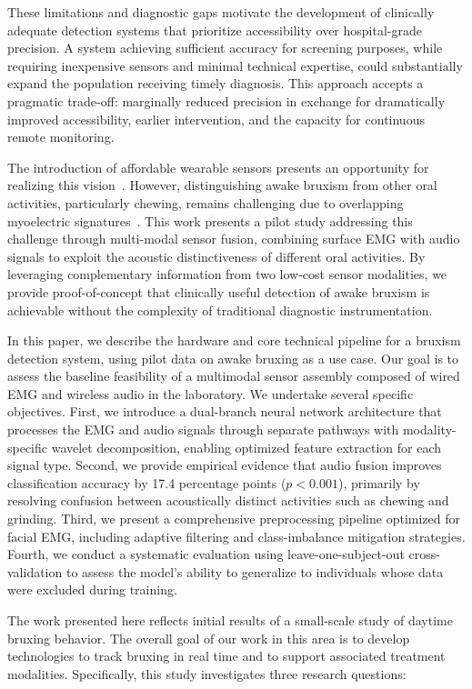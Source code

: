 \documentclass[pdflatex,sn-nature,iicol]{sn-jnl}
\begin{document}
These limitations and diagnostic gaps motivate the development of clinically adequate detection systems that prioritize accessibility over hospital-grade precision. A system achieving sufficient accuracy for screening purposes, while requiring inexpensive sensors and minimal technical expertise, could substantially expand the population receiving timely diagnosis. This approach accepts a pragmatic trade-off: marginally reduced precision in exchange for dramatically improved accessibility, earlier intervention, and the capacity for continuous remote monitoring.

The introduction of affordable wearable sensors presents an opportunity for realizing this vision~\cite{gul2024advanced}. However, distinguishing awake bruxism from other oral activities, particularly chewing, remains challenging due to overlapping myoelectric signatures~\cite{stuginski2016detection}. This work presents a pilot study addressing this challenge through multi-modal sensor fusion, combining surface EMG with audio signals to exploit the acoustic distinctiveness of different oral activities. By leveraging complementary information from two low-cost sensor modalities, we provide proof-of-concept that clinically useful detection of awake bruxism is achievable without the complexity of traditional diagnostic instrumentation.

In this paper, we describe the hardware and core technical pipeline for a bruxism detection system, using pilot data on awake bruxing as a use case. Our goal is to assess the baseline feasibility of a multimodal sensor assembly composed of wired EMG and wireless audio in the laboratory. We undertake several specific objectives. First, we introduce a dual-branch neural network architecture that processes the EMG and audio signals through separate pathways with modality-specific wavelet decomposition, enabling optimized feature extraction for each signal type. Second, we provide empirical evidence that audio fusion improves classification accuracy by 17.4 percentage points ($p < 0.001$), primarily by resolving confusion between acoustically distinct activities such as chewing and grinding. Third, we present a comprehensive preprocessing pipeline optimized for facial EMG, including adaptive filtering and class-imbalance mitigation strategies. Fourth, we conduct a systematic evaluation using leave-one-subject-out cross-validation to assess the model's ability to generalize to individuals whose data were excluded during training.

The work presented here reflects initial results of a small-scale study of daytime bruxing behavior. The overall goal of our work in this area is to develop technologies to track bruxing in real time and to support associated treatment modalities. Specifically, this study investigates three research questions:
\end{document}
